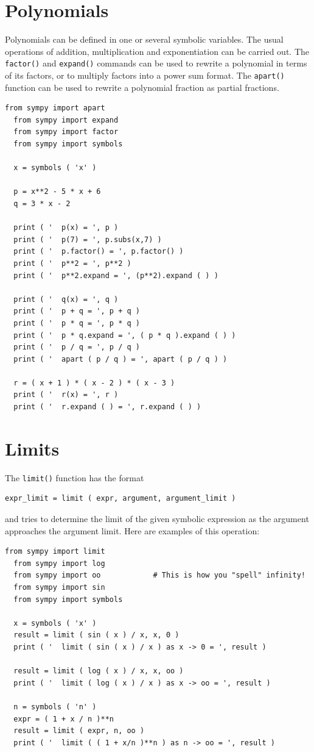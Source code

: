 \documentclass{article}
\begin{document}
\section{Polynomials}

Polynomials can be defined in one or several symbolic variables.
The usual operations of addition, multiplication and exponentiation
can be carried out.  
The {\tt{factor()}} and {\tt{expand()}} commands can be used
to rewrite a polynomial in terms of its factors, or to multiply
factors into a power sum format.  The {\tt{apart()}} function
can be used to rewrite a polynomial fraction as partial fractions.
\begin{lstlisting}[numbers=none]
  from sympy import apart
  from sympy import expand
  from sympy import factor
  from sympy import symbols

  x = symbols ( 'x' )

  p = x**2 - 5 * x + 6
  q = 3 * x - 2

  print ( '  p(x) = ', p )
  print ( '  p(7) = ', p.subs(x,7) )
  print ( '  p.factor() = ', p.factor() )
  print ( '  p**2 = ', p**2 )
  print ( '  p**2.expand = ', (p**2).expand ( ) )

  print ( '  q(x) = ', q )
  print ( '  p + q = ', p + q )
  print ( '  p * q = ', p * q )
  print ( '  p * q.expand = ', ( p * q ).expand ( ) )
  print ( '  p / q = ', p / q )
  print ( '  apart ( p / q ) = ', apart ( p / q ) )

  r = ( x + 1 ) * ( x - 2 ) * ( x - 3 )
  print ( '  r(x) = ', r )
  print ( '  r.expand ( ) = ', r.expand ( ) )
\end{lstlisting}

\section{Limits}

The {\tt{limit()}} function has the format
\begin{lstlisting}[numbers = none ]
  expr_limit = limit ( expr, argument, argument_limit )
\end{lstlisting}
and tries to determine the limit of the given symbolic expression
as the argument approaches the argument limit.  Here are examples
of this operation:
\begin{lstlisting}[numbers=none]
  from sympy import limit
  from sympy import log
  from sympy import oo            # This is how you "spell" infinity!
  from sympy import sin
  from sympy import symbols

  x = symbols ( 'x' )
  result = limit ( sin ( x ) / x, x, 0 )
  print ( '  limit ( sin ( x ) / x ) as x -> 0 = ', result )

  result = limit ( log ( x ) / x, x, oo )
  print ( '  limit ( log ( x ) / x ) as x -> oo = ', result )

  n = symbols ( 'n' )
  expr = ( 1 + x / n )**n
  result = limit ( expr, n, oo )
  print ( '  limit ( ( 1 + x/n )**n ) as n -> oo = ', result )
\end{lstlisting}
\end{document}
